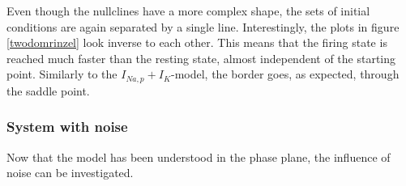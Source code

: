 \documentclass[12pt,a4paper]{article}
\begin{document}
Even though the nullclines have a more complex shape, the sets of initial conditions are again separated by a single line.
Interestingly, the plots in figure \ref{twodomrinzel} look inverse to each other. This means that the firing state is reached much faster than the resting state, almost independent of the starting point. Similarly to the $I_{Na,p}+I_K$-model, the border goes, as expected, through the saddle point.
\subsubsection{System with noise}
Now that the model has been understood in the phase plane, the influence of noise can be investigated.
\begin{figure}[H]

\end{figure}
\end{document}
